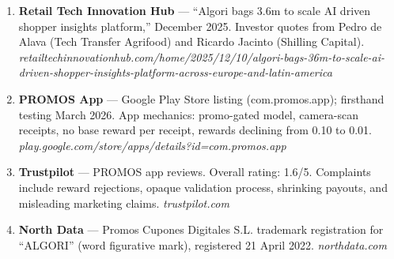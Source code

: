 \documentclass[11pt,a4paper]{article}
\begin{document}
\begin{enumerate}[leftmargin=1.5em, itemsep=2pt, font=\small]
  \item[\textbf{[26]}] \textbf{Retail Tech Innovation Hub} --- ``Algori bags \texteuro{}3.6m to scale AI driven shopper insights platform,'' December 2025. Investor quotes from Pedro de Alava (Tech Transfer Agrifood) and Ricardo Jacinto (Shilling Capital). \textit{retailtechinnovationhub.com/home/2025/12/10/algori-bags-36m-to-scale-ai-driven-shopper-insights-platform-across-europe-and-latin-america}
  \item[\textbf{[27]}] \textbf{PROMOS App} --- Google Play Store listing (com.promos.app); firsthand testing March 2026. App mechanics: promo-gated model, camera-scan receipts, no base reward per receipt, rewards declining from \texteuro{}0.10 to \texteuro{}0.01. \textit{play.google.com/store/apps/details?id=com.promos.app}
  \item[\textbf{[28]}] \textbf{Trustpilot} --- PROMOS app reviews. Overall rating: 1.6/5. Complaints include reward rejections, opaque validation process, shrinking payouts, and misleading marketing claims. \textit{trustpilot.com}
  \item[\textbf{[29]}] \textbf{North Data} --- Promos Cupones Digitales S.L. trademark registration for ``ALGORI'' (word figurative mark), registered 21 April 2022. \textit{northdata.com}
\end{enumerate}

\clearpage

\thispagestyle{empty}
\end{document}
